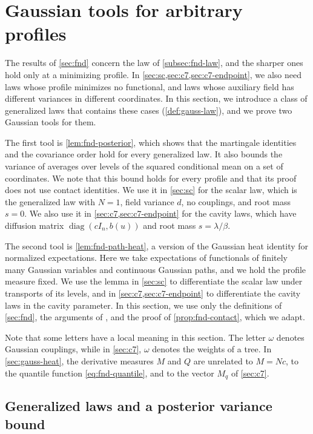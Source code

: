 \chapter{Gaussian tools for arbitrary profiles}\label{sec:gauss}

The results of \cref{sec:fnd} concern the law of \cref{subsec:fnd-law},
and the sharper ones hold only at a minimizing profile. In
\cref{sec:sc,sec:c7,sec:c7-endpoint}, we also need laws whose profile
minimizes no functional, and laws whose auxiliary field has different
variances in different coordinates. In this section, we introduce a
class of generalized laws that contains these cases
(\cref{def:gauss-law}), and we prove two Gaussian tools for them.

The first tool is \cref{lem:fnd-posterior}, which shows that the
martingale identities and the covariance order hold for every generalized
law. It also bounds the variance of averages over
levels of the squared conditional mean on a set of coordinates. We note
that this bound holds for every profile and that its proof does not use
contact identities. We use it in \cref{sec:sc} for the
scalar law, which is the generalized law with $N=1$, field variance $d$,
no couplings, and root mass $s=0$. We also use it in
\cref{sec:c7,sec:c7-endpoint} for the cavity laws, which have diffusion
matrix $\operatorname{diag}(cI_n,b(u))$ and root mass $s=\lambda/\beta$.

The second tool is \cref{lem:fnd-path-heat}, a version of the Gaussian
heat identity for normalized expectations. Here we take expectations of
functionals of finitely many Gaussian
variables and continuous Gaussian paths, and we hold the profile measure
fixed. We use the lemma in
\cref{sec:sc} to differentiate the scalar law under transports of its
levels, and in \cref{sec:c7,sec:c7-endpoint} to differentiate the cavity
laws in the cavity parameter. In this section, we use only the definitions of
\cref{sec:fnd}, the arguments of \cite[Section~2]{AL}, and the proof of
\cref{prop:fnd-contact}, which we adapt.

Note that some letters have a local meaning in this section. The letter
$\omega$ denotes Gaussian couplings, while in \cref{sec:c7}, $\omega$
denotes the
weights of a tree. In \cref{sec:gauss-heat}, the derivative measures $M$
and $Q$ are unrelated to $M=Nc$, to the quantile function
\eqref{eq:fnd-quantile}, and to the vector $M_q$ of \cref{sec:c7}.

\section{Generalized laws and a posterior variance bound}
\label{sec:gauss-posterior}

